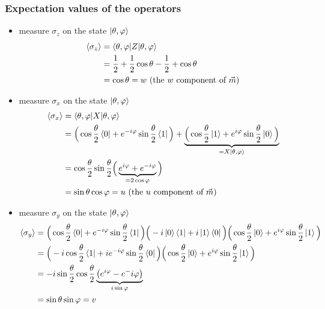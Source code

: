\documentclass{article}
\begin{document}
\subsubsection*{Expectation values of the operators}
\begin{itemize}[label=-]
    \item measure $\sigma_z$ on the state $\ket{\theta, \varphi}$
    \begin{equation}
        \begin{aligned}
            \braket{\sigma_z}
                & = \braket{\theta, \varphi|Z|\theta, \varphi} \\
                & = \frac{1}{2} + \frac{1}{2}\cos\theta - \frac{1}{2} + \cos\theta \\
                & = \cos \theta = w \text{  (the $w$ component of $\vec{m}$)}
        \end{aligned}
    \end{equation}
    \item measure $\sigma_x$ on the state $\ket{\theta, \varphi}$
    \begin{equation}
        \begin{aligned}
            \braket{\sigma_x}
                & = \braket{\theta, \varphi|X|\theta, \varphi} \\
                & = \Big(\cos\frac{\theta}{2}\bra{0}+e^{-i\varphi}\sin\frac{\theta}{2}\bra{1}\Big)
                    + \underbrace{\Big(\cos\frac{\theta}{2}\ket{1}+e^{i\varphi}\sin\frac{\theta}{2}
                    \ket{0}\Big)}_{=X\ket{\theta, \varphi}} \\
                & = \cos\frac{\theta}{2}\sin\frac{\theta}{2}
                    \Big(\underbrace{e^{i\varphi}+e^{-i\varphi}}_{=2\cos\varphi}\Big)\\
                & = \sin\theta\cos\varphi = u \text{  (the $u$ component of $\vec{m}$)}
        \end{aligned}
    \end{equation}
    \item measure $\sigma_y$ on the state $\ket{\theta, \varphi}$
    \begin{equation}
        \begin{aligned}
            \braket{\sigma_y}
                & = \Big(\cos\frac{\theta}{2}\bra{0}+e^{-i\varphi}\sin\frac{\theta}{2}\bra{1}\Big)
                    \Big(-i\ket{0}\bra{1} + i\ket{1}\bra{0}\Big)
                    \Big(\cos\frac{\theta}{2}\ket{0}+e^{i\varphi}\sin\frac{\theta}{2}\ket{1}\Big) \\
                & = \Big(-i\cos\frac{\theta}{2}\bra{1}+ie^{-i\varphi}\sin\frac{\theta}{2}\bra{0}\Big)
                    \Big(\cos\frac{\theta}{2}\ket{0}+e^{i\varphi}\sin\frac{\theta}{2}\ket{1}\Big) \\
                & = -i \sin\frac{\theta}{2}\cos\frac{\theta}{2}
                    \underbrace{\big(e^{i\varphi}-e^-{i\varphi}\big)}_{i\sin\varphi} \\
                & = \sin\theta\sin\varphi = v
            \end{aligned}
    \end{equation}
\end{itemize}
\end{document}
